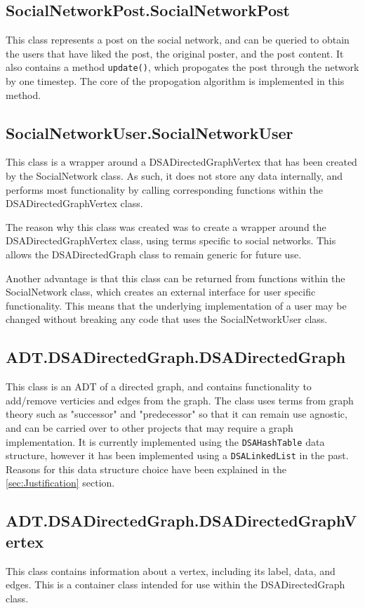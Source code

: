 \documentclass{article}
\begin{document}
\subsection{SocialNetworkPost.SocialNetworkPost}
This class represents a post on the social network,
and can be queried to obtain the users that have liked the post, the original poster,
and the post content. It also contains a method \texttt{update()},
which propogates the post through the network by one timestep.
The core of the propogation algorithm is implemented in this method.

\subsection{SocialNetworkUser.SocialNetworkUser}
This class is a wrapper around a DSADirectedGraphVertex that has been created
by the SocialNetwork class. As such, it does not store any data internally,
and performs most functionality by calling corresponding functions within the DSADirectedGraphVertex class.

The reason why this class was created was to create a wrapper around the
DSADirectedGraphVertex class, using terms specific to social networks.
This allows the DSADirectedGraph class to remain generic for future use.

Another advantage is that this class can be returned from functions within
the SocialNetwork class, which creates an external interface for user specific
functionality. This means that the underlying implementation of a user may be
changed without breaking any code that uses the SocialNetworkUser class.

\subsection{ADT.DSADirectedGraph.DSADirectedGraph}
This class is an ADT of a directed graph, and contains functionality to add/remove verticies and edges from the graph.
The class uses terms from graph theory such as "successor" and "predecessor"
so that it can remain use agnostic, and can be carried over to other projects
that may require a graph implementation.
It is currently implemented using the \texttt{DSAHashTable} data structure,
however it has been implemented using a \texttt{DSALinkedList} in the past.
Reasons for this data structure choice have been explained in the \autoref{sec:Justification} section.

\subsection{ADT.DSADirectedGraph.DSADirectedGraphVertex}
This class contains information about a vertex, including its label, data, and edges.
This is a container class intended for use within the DSADirectedGraph class.
\end{document}
